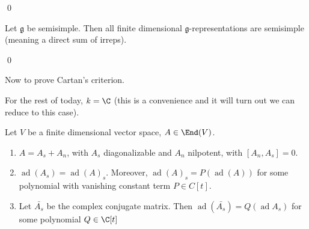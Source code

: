 \documentclass[x11names,reqno,14pt]{extarticle}
\newcommand{\mk}[1]{\mathfrak{#1}}
\newcommand{\g}{\mk{g}}
\DeclareMathOperator{\ad}{ad}
\begin{document}
\qed

\cor

Let $\g$ be semisimple. Then all finite dimensional $\g$-representations are semisimple (meaning a direct sum of irreps). 

\proof

\qed

Now to prove Cartan's criterion. 

For the rest of today, $k = \C$ (this is a convenience and it will turn out we can reduce to this case). 

\thm

Let $V$ be a finite dimensional vector space, $A \in \End(V)$. 
\begin{enumerate}

\item $A = A_s + A_n$, with $A_s$ diagonalizable and $A_n$ nilpotent, with $[A_n,A_s] = 0$. 

\item $\ad(A_s) = \ad(A)_s$. Moreover, $\ad(A)_s = P(\ad(A))$ for some polynomial with vanishing constant term $P \in C[t]$. 

\item Let $\bar{A_s}$ be the complex conjugate matrix. Then $\ad(\bar{A_s}) = Q(\ad A_s)$ for some polynomial $Q \in \C[t]$

\end{enumerate}
\end{document}
